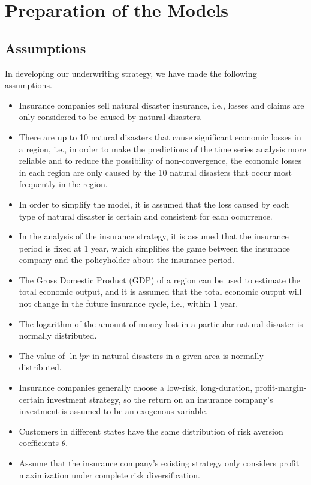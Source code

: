 \documentclass[12pt]{article}  %
\begin{document}
\section{Preparation of the Models}
\subsection{Assumptions}
In developing our underwriting strategy, we have made the following assumptions.
\begin{itemize}
    \item Insurance companies sell natural disaster insurance, i.e., losses and claims are only considered to be caused by natural disasters.
    \item There are up to 10 natural disasters that cause significant economic losses in a region, i.e., in order to make the predictions of the time series analysis more reliable and to reduce the possibility of non-convergence, the economic losses in each region are only caused by the 10 natural disasters that occur most frequently in the region.
    \item In order to simplify the model, it is assumed that the loss caused by each type of natural disaster is certain and consistent for each occurrence.
    \item In the analysis of the insurance strategy, it is assumed that the insurance period is fixed at 1 year, which simplifies the game between the insurance company and the policyholder about the insurance period.
    \item The Gross Domestic Product (GDP) of a region can be used to estimate the total economic output, and it is assumed that the total economic output will not change in the future insurance cycle, i.e., within 1 year.
    \item The logarithm of the amount of money lost in a particular natural disaster is normally distributed.
    \item The value of $\ln lpr$ in natural disasters in a given area is normally distributed.
    \item Insurance companies generally choose a low-risk, long-duration, profit-margin-certain investment strategy, so the return on an insurance company's investment is assumed to be an exogenous variable.
    \item Customers in different states have the same distribution of risk aversion coefficients $\theta$.
    \item Assume that the insurance company's existing strategy only considers profit maximization under complete risk diversification.
\end{itemize}
\end{document}
